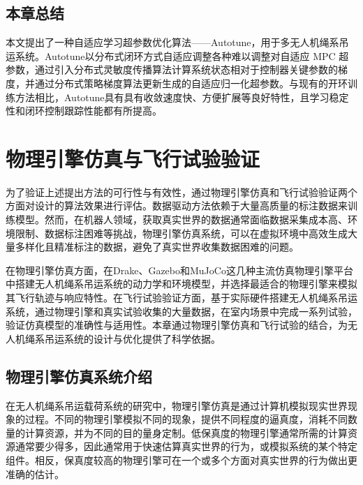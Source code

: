 \documentclass[lang=chs, degree=master, blindreview=false, winfonts=true]{yanputhesis}
\begin{document}


\section{本章总结}
本文提出了一种自适应学习超参数优化算法——Autotune，用于多无人机绳系吊运系统。Autotune以分布式闭环方式自适应调整各种难以调整对自适应 MPC 超参数，通过引入分布式灵敏度传播算法计算系统状态相对于控制器关键参数的梯度，并通过分布式策略梯度算法更新生成的自适应归一化超参数。与现有的开环训练方法相比，Autotune具有具有收敛速度快、方便扩展等良好特性，且学习稳定性和闭环控制跟踪性能都有所提高。


\cleardoublepage

\chapter{物理引擎仿真与飞行试验验证}
为了验证上述提出方法的可行性与有效性，通过物理引擎仿真和飞行试验验证两个方面对设计的算法效果进行评估。数据驱动方法依赖于大量高质量的标注数据来训练模型。然而，在机器人领域，获取真实世界的数据通常面临数据采集成本高、环境限制、数据标注困难等挑战，物理引擎仿真系统，可以在虚拟环境中高效生成大量多样化且精准标注的数据，避免了真实世界收集数据困难的问题。

在物理引擎仿真方面，在Drake、Gazebo和MuJoCo这几种主流仿真物理引擎平台中搭建无人机绳系吊运系统的动力学和环境模型，并选择最适合的物理引擎来模拟其飞行轨迹与响应特性。在飞行试验验证方面，基于实际硬件搭建无人机绳系吊运系统，通过物理引擎和真实试验收集的大量数据，在室内场景中完成一系列试验，验证仿真模型的准确性与适用性。本章通过物理引擎仿真和飞行试验的结合，为无人机绳系吊运系统的设计与优化提供了科学依据。
\section{物理引擎仿真系统介绍}
在无人机绳系吊运载荷系统的研究中，物理引擎仿真是通过计算机模拟现实世界现象的过程。不同的物理引擎模拟不同的现象，提供不同程度的逼真度，消耗不同数量的计算资源，并为不同的目的量身定制。低保真度的物理引擎通常所需的计算资源通常要少得多，因此通常用于快速估算真实世界的行为，或模拟系统的某个特定组件。相反，保真度较高的物理引擎可在一个或多个方面对真实世界的行为做出更准确的估计。
\end{document}
